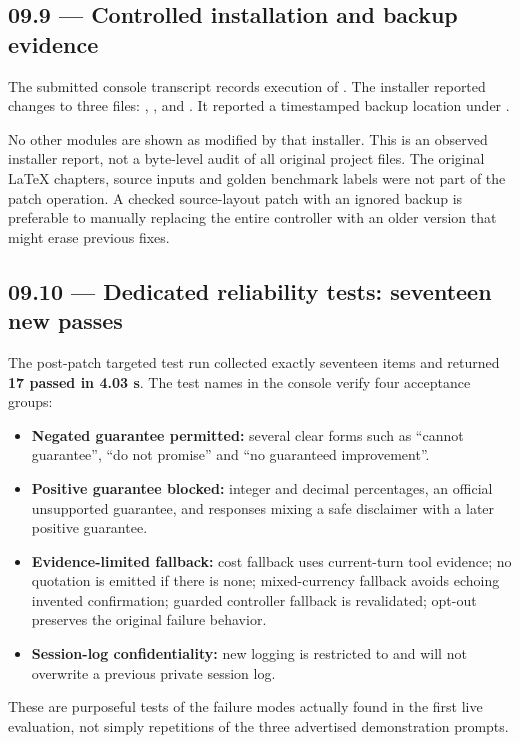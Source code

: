 \documentclass[11pt,a4paper]{article}
\DeclareRobustCommand{\code}[1]{{\ttfamily\small\detokenize{#1}}}
\begin{document}
\subsection{09.9 --- Controlled installation and backup evidence}
The submitted console transcript records execution of . The installer reported changes to three files: , , and . It reported a timestamped backup location under .

No other modules are shown as modified by that installer. This is an observed installer report, not a byte-level audit of all original project files. The original LaTeX chapters, source inputs and golden benchmark labels were not part of the patch operation. A checked source-layout patch with an ignored backup is preferable to manually replacing the entire controller with an older version that might erase previous fixes.

\subsection{09.10 --- Dedicated reliability tests: seventeen new passes}
The post-patch targeted test run collected exactly seventeen items and returned \textbf{17 passed in 4.03 s}. The test names in the console verify four acceptance groups:
\begin{itemize}
\item \textbf{Negated guarantee permitted:} several clear forms such as ``cannot guarantee'', ``do not promise'' and ``no guaranteed improvement''.
\item \textbf{Positive guarantee blocked:} integer and decimal percentages, an official unsupported guarantee, and responses mixing a safe disclaimer with a later positive guarantee.
\item \textbf{Evidence-limited fallback:} cost fallback uses current-turn tool evidence; no quotation is emitted if there is none; mixed-currency fallback avoids echoing invented confirmation; guarded controller fallback is revalidated; opt-out preserves the original failure behavior.
\item \textbf{Session-log confidentiality:} new logging is restricted to \code{local_cache} and will not overwrite a previous private session log.
\end{itemize}
These are purposeful tests of the failure modes actually found in the first live evaluation, not simply repetitions of the three advertised demonstration prompts.
\end{document}
